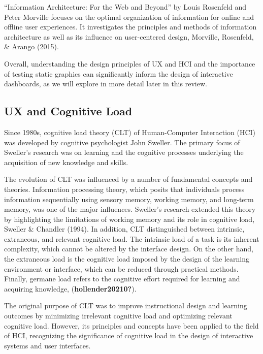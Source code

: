 \documentclass[print]{nuthesis}
\begin{document}
``Information Architecture: For the Web and Beyond'' by Louis Rosenfeld and Peter Morville focuses on the optimal organization of information for online and offline user experiences.
It investigates the principles and methods of information architecture as well as its influence on user-centered design, Morville, Rosenfeld, \& Arango (2015).

Overall, understanding the design principles of UX and HCI and the importance of testing static graphics can significantly inform the design of interactive dashboards, as we will explore in more detail later in this review.

\hypertarget{ux-and-cognitive-load}{%
\subsection{UX and Cognitive Load}\label{ux-and-cognitive-load}}

Since 1980s, cognitive load theory (CLT) of Human-Computer Interaction (HCI) was developed by cognitive psychologist John Sweller.
The primary focus of Sweller's research was on learning and the cognitive processes underlying the acquisition of new knowledge and skills.

The evolution of CLT was influenced by a number of fundamental concepts and theories.
Information processing theory, which posits that individuals process information sequentially using sensory memory, working memory, and long-term memory, was one of the major influences.
Sweller's research extended this theory by highlighting the limitations of working memory and its role in cognitive load, Sweller \& Chandler (1994).
In addition, CLT distinguished between intrinsic, extraneous, and relevant cognitive load.
The intrinsic load of a task is its inherent complexity, which cannot be altered by the interface design.
On the other hand, the extraneous load is the cognitive load imposed by the design of the learning environment or interface, which can be reduced through practical methods.
Finally, germane load refers to the cognitive effort required for learning and acquiring knowledge, (\textbf{hollender20210?}).

The original purpose of CLT was to improve instructional design and learning outcomes by minimizing irrelevant cognitive load and optimizing relevant cognitive load.
However, its principles and concepts have been applied to the field of HCI, recognizing the significance of cognitive load in the design of interactive systems and user interfaces.
\end{document}

